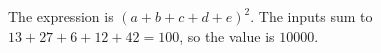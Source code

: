 The expression is $(a+b+c+d+e)^2$. The inputs sum to $13+27+6+12+42=100$, so the value is $\boxed{10000}$.
